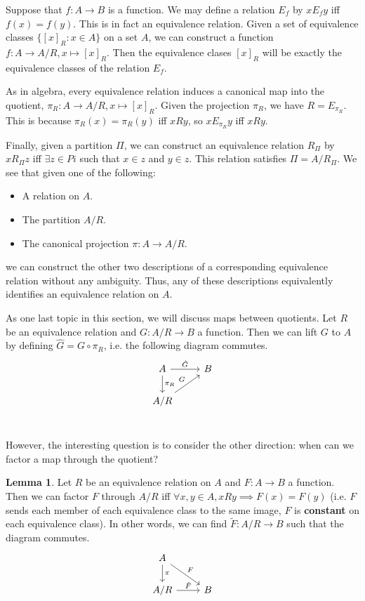 \documentclass[11pt, oneside]{article}   	%
\theoremstyle{definition}
\newtheorem{lemma}[theorem]{Lemma}
\begin{document}
Suppose that $f : A\rightarrow B$ is a function. We may define a relation $E_f$ by $x E_f y$ iff $f(x) = f(y)$. This is in fact 
an equivalence relation. Given a set of equivalence classes $\{[x]_R : x\in A\}$ on a set $A$, we can construct a function 
$f : A\rightarrow A / R, x\mapsto [x]_R$. Then the equivalence clases $[x]_R$ will be exactly the equivalence classes of the 
relation $E_f$. 

As in algebra, every equivalence relation induces a canonical map into the quotient, $\pi_R : A\rightarrow A / R, x\mapsto 
[x]_R$. Given the projection $\pi_R$, we have $R = E_{\pi_R}$. This is because $\pi_R(x) = \pi_R(y)$ iff $x R y$, so $x 
E_{\pi_R} y$ iff $x R y$. 

Finally, given a partition $\Pi$, we can construct an equivalence relation $R_\Pi$ by $x R_\Pi z$ iff $\exists z\in Pi$ such that 
$x\in z$ and $y\in z$. This relation satisfies $\Pi = A / R_\Pi$. We see that given one of the following:
\begin{itemize}
	\item A relation on $A$.
	\item The partition $A / R$. 
	\item The canonical projection $\pi : A\rightarrow A / R$. 
\end{itemize}
we can construct the other two descriptions of a corresponding equivalence relation without any ambiguity. Thus, any of these 
descriptions equivalently identifies an equivalence relation on $A$. 

As one last topic in this section, we will discuss maps between quotients. Let $R$ be an equivalence relation and $G : 
A / R\rightarrow B$ a function. Then we can lift $G$ to $A$ by defining $\hat G = G\circ\pi_R$, i.e. the following diagram 
commutes.
\[
	\begin{tikzcd}
		A \arrow[r, "\hat G"] \arrow[d, "\pi_R"] & B \\
		A / R \arrow[ru, "G"] & {} \\
	\end{tikzcd}
\]

However, the interesting question is to consider the other direction: when can we factor a map through the quotient?
\begin{lemma}
	Let $R$ be an equivalence relation on $A$ and $F : A\rightarrow B$ a function. Then we can factor $F$ through $A / R$ 
	iff $\forall x, y\in A, x R y\implies F(x) = F(y)$ (i.e. $F$ sends each member of each equivalence class to the same image, 
	$F$ is \textbf{constant} on each equivalence class). In other words, we can find $\tilde F : A / R\rightarrow B$ such that 
	the diagram commutes.
\[
	\begin{tikzcd}
		A \arrow[d, "\pi"] \arrow[dr, "F"] & {} \\
		A / R \arrow[r, "\tilde F"] & B \\
	\end{tikzcd}
\]
\end{lemma}
\end{document}
